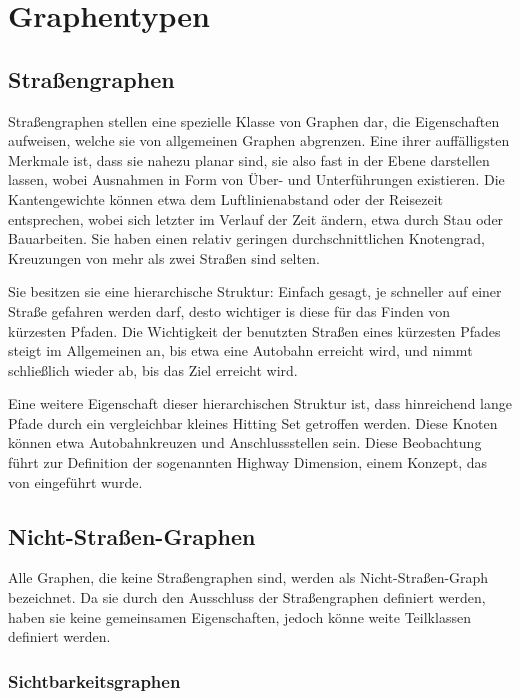 \section{Graphentypen}
\subsection{Straßengraphen}\label{graphs:strassengraphen}

Straßengraphen stellen eine spezielle Klasse von Graphen dar, die  Eigenschaften aufweisen, welche sie von allgemeinen Graphen abgrenzen.
Eine ihrer auffälligsten Merkmale ist, dass sie nahezu planar sind, sie also fast in der Ebene darstellen lassen, wobei Ausnahmen in Form von Über- und Unterführungen existieren.
Die Kantengewichte können etwa dem Luftlinienabstand oder der Reisezeit entsprechen, wobei sich letzter im Verlauf der Zeit ändern, etwa durch Stau oder Bauarbeiten.
Sie haben einen relativ geringen durchschnittlichen Knotengrad, Kreuzungen von mehr als zwei Straßen sind selten.

Sie besitzen sie eine hierarchische Struktur: Einfach gesagt, je schneller auf einer Straße gefahren werden darf, desto wichtiger is diese für das Finden von kürzesten Pfaden.
Die Wichtigkeit der benutzten Straßen eines kürzesten Pfades steigt im Allgemeinen an, bis etwa eine Autobahn erreicht wird, und nimmt schließlich wieder ab, bis das Ziel erreicht wird.

Eine weitere Eigenschaft dieser hierarchischen Struktur ist, dass hinreichend lange Pfade durch ein vergleichbar kleines Hitting Set getroffen werden.
Diese Knoten können etwa Autobahnkreuzen und Anschlussstellen sein.
Diese Beobachtung führt zur Definition der sogenannten Highway Dimension, einem Konzept, das von \cite{abraham2010highway} eingeführt wurde.

\subsection{Nicht-Straßen-Graphen}

Alle Graphen, die keine Straßengraphen sind, werden als Nicht-Straßen-Graph bezeichnet.
Da sie durch den Ausschluss der Straßengraphen definiert werden, haben sie keine gemeinsamen Eigenschaften, jedoch könne weite Teilklassen definiert werden.

\subsubsection{Sichtbarkeitsgraphen}

